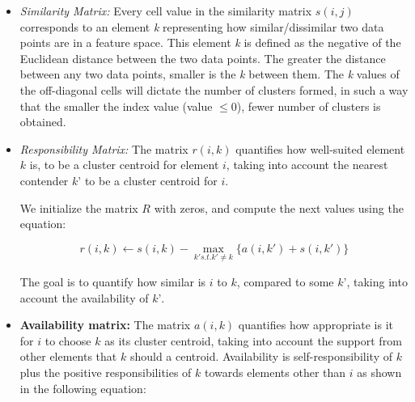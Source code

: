 \documentclass[../UNBThesis2.tex]{subfiles}
\begin{document}
\begin{itemize}

  \item\textit{Similarity Matrix:}
  Every cell value in the similarity matrix $s(i,j)$ corresponds to an element \textit{k} representing how similar/dissimilar two data points are in a feature space. This element \textit{k} is defined as the negative of the Euclidean distance between the two data points. The greater the distance between any two data points, smaller is the \textit{k} between them. The \textit{k} values of the off-diagonal cells will dictate the number of clusters formed, in such a way that the smaller the index value (value	$\leq$0), fewer number of clusters is obtained.
  \item\textit{Responsibility Matrix:} The matrix $r(i , k)$ quantifies how well-suited element $k$ is, to be a cluster centroid for element $i$, taking into account the nearest contender $k’$ to be a cluster centroid for $i$.
  
  We initialize the matrix $R$ with zeros, and compute the next values using the equation:

    \begin{equation}
        r(i, k) \leftarrow s(i, k) - \max\limits_{k' s.t. k' \neq k}\{ a(i, k') + s(i, k') \}
    \end{equation}
 
 The goal is to quantify how similar is $i$ to $k$, compared to some $k$’, taking into account the availability of $k’$.   
    
  \item\textbf{Availability matrix:} The matrix $a(i,k)$ quantifies how appropriate is it for $i$ to choose $k$ as its cluster centroid, taking into account the support from other elements that $k$ should a centroid. Availability is self-responsibility of $k$ plus the positive responsibilities of $k$ towards elements other than $i$ as shown in the following equation:
  

\end{itemize}
\end{document}
